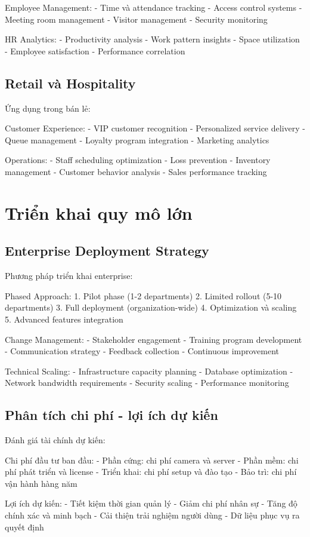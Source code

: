 \documentclass[12pt,a4paper]{report}
\begin{document}
Employee Management:
- Time và attendance tracking
- Access control systems
- Meeting room management
- Visitor management
- Security monitoring

HR Analytics:
- Productivity analysis
- Work pattern insights
- Space utilization
- Employee satisfaction
- Performance correlation

\subsection{Retail và Hospitality}
Ứng dụng trong bán lẻ:

Customer Experience:
- VIP customer recognition
- Personalized service delivery
- Queue management
- Loyalty program integration
- Marketing analytics

Operations:
- Staff scheduling optimization
- Loss prevention
- Inventory management
- Customer behavior analysis
- Sales performance tracking

\section{Triển khai quy mô lớn}
\subsection{Enterprise Deployment Strategy}
Phương pháp triển khai enterprise:

Phased Approach:
1. Pilot phase (1-2 departments)
2. Limited rollout (5-10 departments)
3. Full deployment (organization-wide)
4. Optimization và scaling
5. Advanced features integration

Change Management:
- Stakeholder engagement
- Training program development
- Communication strategy
- Feedback collection
- Continuous improvement

Technical Scaling:
- Infrastructure capacity planning
- Database optimization
- Network bandwidth requirements
- Security scaling
- Performance monitoring

\subsection{Phân tích chi phí - lợi ích dự kiến}
Đánh giá tài chính dự kiến:

Chi phí đầu tư ban đầu:
- Phần cứng: chi phí camera và server
- Phần mềm: chi phí phát triển và license
- Triển khai: chi phí setup và đào tạo
- Bảo trì: chi phí vận hành hàng năm

Lợi ích dự kiến:
- Tiết kiệm thời gian quản lý
- Giảm chi phí nhân sự
- Tăng độ chính xác và minh bạch
- Cải thiện trải nghiệm người dùng
- Dữ liệu phục vụ ra quyết định
\end{document}
